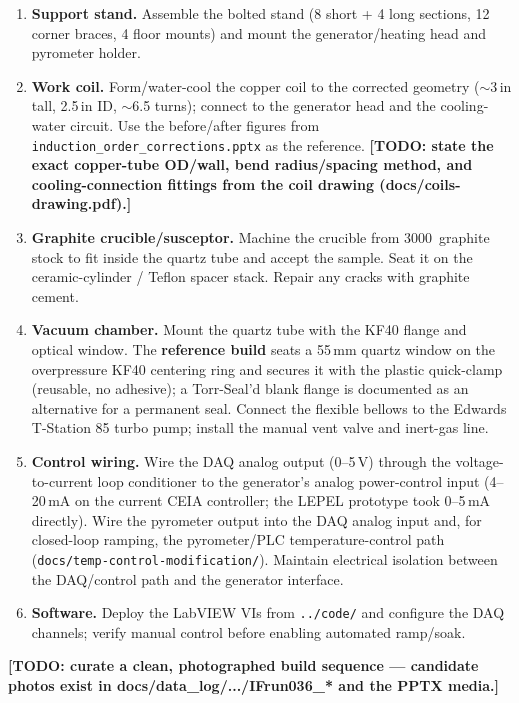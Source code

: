\documentclass[5p,times]{elsarticle}
\newcommand{\todo}[1]{{\color{red}\textbf{[TODO: #1]}}}
\begin{document}
\begin{enumerate}[nosep]
\item \textbf{Support stand.} Assemble the bolted stand (8 short + 4 long sections, 12
corner braces, 4 floor mounts) and mount the generator/heating head and pyrometer
holder.
\item \textbf{Work coil.} Form/water-cool the copper coil to the corrected geometry
($\sim$3\,in tall, 2.5\,in ID, $\sim$6.5 turns); connect to the generator head and
the cooling-water circuit. Use the before/after figures from
\texttt{induction\_order\_corrections.pptx} as the reference. \todo{state the exact
copper-tube OD/wall, bend radius/spacing method, and cooling-connection fittings from
the coil drawing (docs/coils-drawing.pdf).}
\item \textbf{Graphite crucible/susceptor.} Machine the crucible from 3000\,\celsius{}
graphite stock to fit inside the quartz tube and accept the sample. Seat it on the
ceramic-cylinder / Teflon spacer stack. Repair any cracks with graphite cement.
\item \textbf{Vacuum chamber.} Mount the quartz tube with the KF40 flange and optical
window. The \textbf{reference build} seats a 55\,mm quartz window on the overpressure
KF40 centering ring and secures it with the plastic quick-clamp (reusable, no
adhesive); a Torr-Seal'd blank flange is documented as an alternative for a permanent
seal. Connect the flexible bellows to the Edwards T-Station 85 turbo pump; install
the manual vent valve and inert-gas line.
\item \textbf{Control wiring.} Wire the DAQ analog output (0--5\,V) through the
voltage-to-current loop conditioner to the generator's analog power-control input
(4--20\,mA on the current CEIA controller; the LEPEL prototype took 0--5\,mA
directly). Wire the pyrometer output into the DAQ analog input and, for closed-loop
ramping, the pyrometer/PLC temperature-control path
(\texttt{docs/temp-control-modification/}). Maintain electrical isolation between the
DAQ/control path and the generator interface.
\item \textbf{Software.} Deploy the LabVIEW VIs from \texttt{../code/} and configure
the DAQ channels; verify manual control before enabling automated ramp/soak.
\end{enumerate}

\todo{curate a clean, photographed build sequence --- candidate photos exist in
docs/data\_log/.../IFrun036\_* and the PPTX media.}

\end{document}
